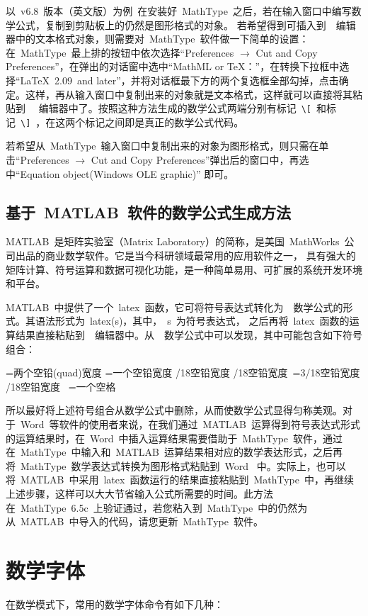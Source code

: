 以~v6.8~版本（英文版）为例~在安装好~MathType~之后，若在输入窗口中编写数学公式，复制到剪贴板上的仍然是图形格式的对象。
若希望得到可插入到~\XeLaTeX~编辑器中的文本格式对象，则需要对~MathType~软件做一下简单的设置：在~MathType~最上排的按钮中依次选择“Preferences
$\rightarrow$ Cut and Copy Preferences”，在弹出的对话窗中选中“MathML or TeX：”，在转换下拉框中选择“LaTeX~2.09~and later”，并将对话框最下方的两个复选框全部勾掉，点击确定。这样，再从输入窗口中复制出来的对象就是文本格式，这样就可以直接将其粘贴到~\XeLaTeX~
编辑器中了。按照这种方法生成的数学公式两端分别有标记~\verb|\[|~和标记~\verb|\]|~，在这两个标记之间即是真正的数学公式代码。

若希望从~MathType~输入窗口中复制出来的对象为图形格式，则只需在单击“Preferences
$\rightarrow$ Cut and Copy Preferences”弹出后的窗口中，再选中“Equation object(Windows OLE graphic)” 即可。

\subsection{基于~MATLAB~软件的数学公式生成方法}
MATLAB~是矩阵实验室（Matrix Laboratory）的简称，是美国~MathWorks~公司出品的商业数学软件。它是当今科研领域最常用的应用软件之一，
具有强大的矩阵计算、符号运算和数据可视化功能，是一种简单易用、可扩展的系统开发环境和平台。

MATLAB~中提供了一个~latex~函数，它可将符号表达式转化为~\XeLaTeX~数学公式的形式。其语法形式为~latex(s)，其中，~s~为符号表达式，
之后再将~latex~函数的运算结果直接粘贴到~\XeLaTeX~编辑器中。从~\XeLaTeX~数学公式中可以发现，其中可能包含如下符号组合：

\begin{verbatim*}
\qquad=两个空铅(quad)宽度
\quad=一个空铅宽度
/18空铅宽度
/18空铅宽度
\,=3/18空铅宽度
/18空铅宽度
\ =一个空格
\end{verbatim*}

所以最好将上述符号组合从数学公式中删除，从而使数学公式显得匀称美观。对于~Word~等软件的使用者来说，在我们通过~MATLAB~运算得到符号表达式形式的运算结果时，在~Word~中插入运算结果需要借助于~MathType~软件，通过在~MathType~中输入和~MATLAB~运算结果相对应的数学表达形式，之后再将~MathType~数学表达式转换为图形格式粘贴到~Word~ 中。实际上，也可以将~MATLAB~中采用~latex~函数运行的结果直接粘贴到~MathType~中，再继续上述步骤，这样可以大大节省输入公式所需要的时间。此方法在~MathType~6.5c~上验证通过，若您粘入到~MathType~中的仍然为从~MATLAB~中导入的代码，请您更新~MathType~软件。

\section{数学字体}
在数学模式下，常用的数学字体命令有如下几种：

